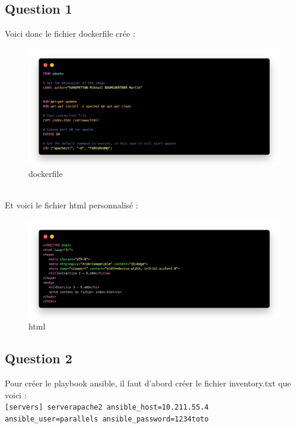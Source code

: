 \documentclass[12pt, a4paper]{article}
\begin{document}
\subsection{Question 1}
Voici donc le fichier dockerfile crée : 
\begin{figure}[h]
	\centering
	\includegraphics[width=1\textwidth]{img/dockerfile.png}
	\caption{dockerfile}
	\label{fig:1}
\end{figure}\\
Et voici le fichier html personnalisé :
\begin{figure}[h]
	\centering
	\includegraphics[width=1\textwidth]{img/html.png}
	\caption{html}
	\label{fig:2}
\end{figure}

\newpage
\subsection{Question 2}
Pour créer le playbook ansible, il faut d'abord créer le fichier inventory.txt que voici : \\

\texttt{[servers]
serverapache2 ansible\_host=10.211.55.4 ansible\_user=parallels ansible\_password=1234toto}
\end{document}
